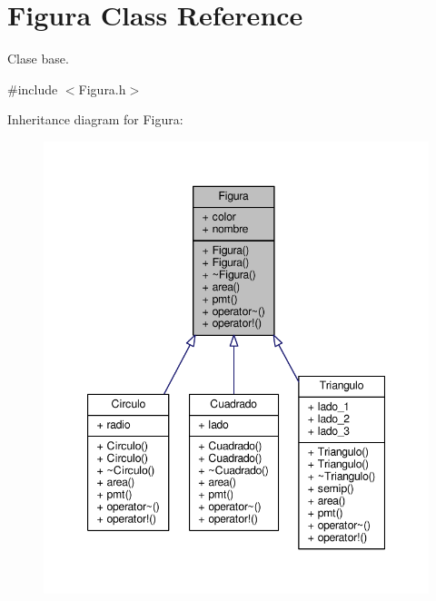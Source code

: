 \hypertarget{class_figura}{\section{Figura Class Reference}
\label{class_figura}
}


Clase base.  




{\ttfamily \#include $<$Figura.\+h$>$}



Inheritance diagram for Figura\+:
\nopagebreak
\begin{figure}[H]
\begin{center}
\leavevmode
\includegraphics[width=347pt]{class_figura__inherit__graph}
\end{center}
\end{figure}
